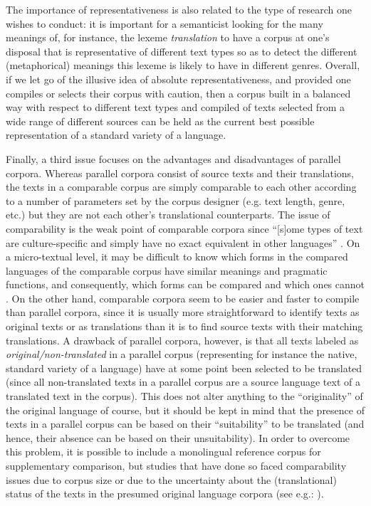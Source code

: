 The importance of representativeness is also related to the type of research one wishes to conduct: it is important for a semanticist looking for the many meanings of, for instance, the lexeme \textit{translation} to have a corpus at one’s disposal that is representative of different text types so as to detect the different (metaphorical) meanings this lexeme is likely to have in different genres. Overall, if we let go of the illusive idea of absolute representativeness, and provided one compiles or selects their corpus with caution, then a corpus built in a balanced way with respect to different text types and compiled of texts selected from a wide range of different sources can be held as the current best possible representation of a standard variety of a language.

Finally, a third issue focuses on the advantages and disadvantages of parallel corpora. Whereas parallel corpora consist of source texts and their translations, the texts in a comparable corpus are simply comparable to each other according to a number of parameters set by the corpus designer (e.g. text length, genre, etc.) but they are not each other’s translational counterparts. The issue of comparability is the weak point of comparable corpora since “[s]ome types of text are culture-specific and simply have no exact equivalent in other languages” \citep[19]{granger_corpus_2003}. On a micro-textual level, it may be difficult to know which forms in the compared languages of the comparable corpus have similar meanings and pragmatic functions, and consequently, which forms can be compared and which ones cannot \citep[5]{johansson_translational_1998}. On the other hand, comparable corpora seem to be easier and faster to compile than parallel corpora, since it is usually more straightforward to identify texts as original texts or as translations than it is to find source texts with their matching translations. A drawback of parallel corpora, however, is that all texts labeled as \textit{original\slash non-translated} in a parallel corpus (representing for instance the native, standard variety of a language) have at some point been selected to be translated (since all non-translated texts in a parallel corpus are a source language text of a translated text in the corpus). This does not alter anything to the ``originality'' of the original language of course, but it should be kept in mind that the presence of texts in a parallel corpus can be based on their ``suitability'' to be translated (and hence, their absence can be based on their unsuitability). In order to overcome this problem, it is possible to include a monolingual reference corpus for supplementary comparison, but studies that have done so faced comparability issues due to corpus size or due to the uncertainty about the (translational) status of the texts in the presumed original language corpora (see e.g.: \citealt{musolff_conceptual_2014}).

